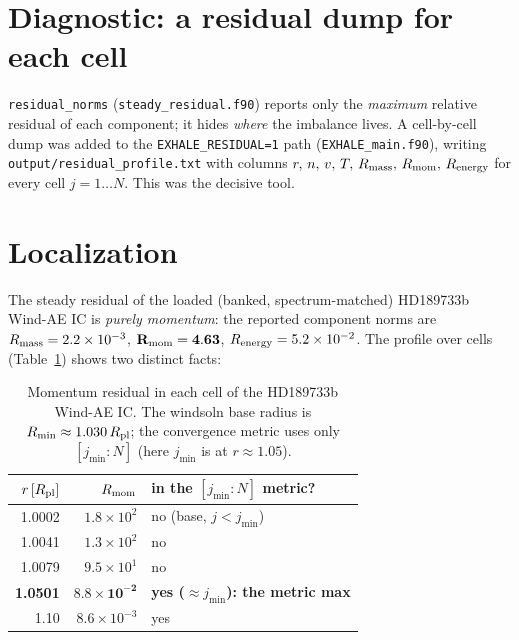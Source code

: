 \documentclass[english,a4paper]{my_memo}
\newcommand{\code}[1]{\texttt{#1}}
\newcommand{\Rp}{R_{\rm pl}}
\begin{document}
\section{Diagnostic: a residual dump for each cell}
\code{residual\_norms} (\code{steady\_residual.f90}) reports only the
\emph{maximum} relative residual of each component; it hides \emph{where} the
imbalance lives. A cell-by-cell dump was added to the \code{EXHALE\_RESIDUAL=1}
path (\code{EXHALE\_main.f90}), writing
\code{output/residual\_profile.txt} with columns
$r,\,n,\,v,\,T,\,R_{\rm mass},\,R_{\rm mom},\,R_{\rm energy}$ for every cell
$j=1\dots N$. This was the decisive tool.

\section{Localization}
The steady residual of the loaded (banked, spectrum-matched) HD189733b
Wind-AE IC is \emph{purely momentum}: the reported component norms are
$R_{\rm mass}=2.2\times10^{-3}$, $\mathbf{R_{\rm mom}=4.63}$,
$R_{\rm energy}=5.2\times10^{-2}$. The profile over cells
(Table~\ref{tab:loc}) shows two distinct facts:

\begin{table}[h]\centering\small
\caption{Momentum residual in each cell of the HD189733b Wind-AE IC. The
windsoln base radius is $R_{\rm min}\approx1.030\,\Rp$; the convergence
metric uses only $[j_{\min}:N]$ (here $j_{\min}$ is at $r\approx1.05$).}
\label{tab:loc}
\begin{tabular}{@{}r r l@{}}
\toprule
$r\,[\Rp]$ & $R_{\rm mom}$ & in the $[j_{\min}:N]$ metric? \\
\midrule
1.0002 & $1.8\times10^{2}$ & no (base, $j<j_{\min}$) \\
1.0041 & $1.3\times10^{2}$ & no \\
1.0079 & $9.5\times10^{1}$ & no \\
\textbf{1.0501} & $\mathbf{8.8\times10^{-2}}$ & \textbf{yes ($\approx j_{\min}$): the metric max} \\
1.10   & $8.6\times10^{-3}$ & yes \\
\bottomrule
\end{tabular}
\end{table}
\end{document}
